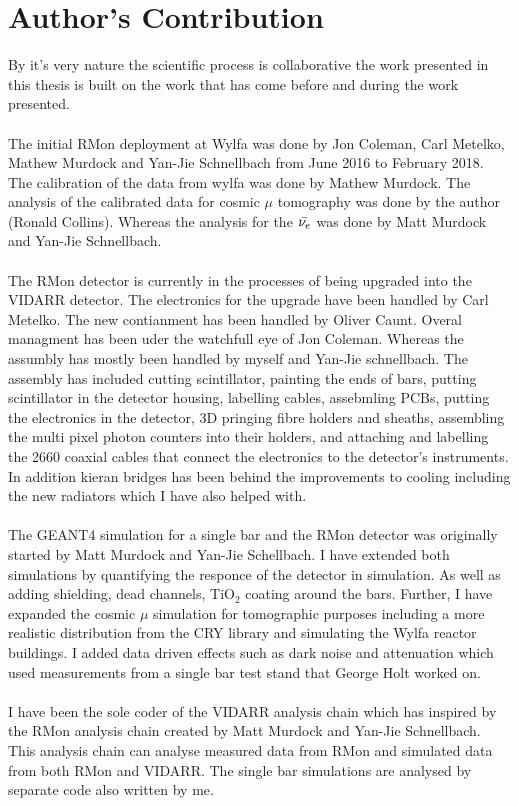 \chapter{Author's Contribution}

By it's very nature the scientific process is collaborative the work presented in this thesis is built on the work that has come before and during the work presented. 
\\\\The initial RMon deployment at Wylfa was done by Jon Coleman, Carl Metelko, Mathew Murdock and Yan-Jie Schnellbach from June 2016 to February 2018. The calibration of the data from wylfa was done by Mathew Murdock. The analysis of the calibrated data for cosmic $\mu$ tomography was done by the author (Ronald Collins). Whereas the analysis for the $\Bar{\nu_e}$ was done by Matt Murdock and Yan-Jie Schnellbach. 
\\\\The RMon detector is currently in the processes of being upgraded into the VIDARR detector. The electronics for the upgrade have been handled by Carl Metelko. The new contianment has been handled by Oliver Caunt. Overal managment has been uder the watchfull eye of Jon Coleman. Whereas the assumbly has mostly been handled by myself and Yan-Jie schnellbach. The assembly has included cutting scintillator, painting the ends of bars, putting scintillator in the detector housing, labelling cables, assebmling PCBs, putting the electronics in the detector, 3D pringing fibre holders and sheaths, assembling the multi pixel photon counters into their holders, and attaching and labelling the 2660 coaxial cables that connect the electronics to the detector's instruments. In addition kieran bridges has been behind the improvements to cooling including the new radiators which I have also helped with. 
\\\\The GEANT4 simulation for a single bar and the RMon detector was originally started by Matt Murdock and Yan-Jie Schellbach. I have extended both simulations by quantifying the responce of the detector in simulation. As well as adding shielding, dead channels, TiO$_2$ coating around the bars. Further, I have expanded the cosmic $\mu$  simulation for tomographic purposes including a more realistic distribution from the CRY library and simulating the Wylfa reactor buildings. I added data driven effects such as dark noise and attenuation which used measurements from a single bar test stand that George Holt worked on. 
\\\\I have been the sole coder of the VIDARR analysis chain which has inspired by the RMon analysis chain created by Matt Murdock and Yan-Jie Schnellbach. This analysis chain can analyse measured data from RMon and simulated data from both RMon and VIDARR. The single bar simulations are analysed by separate code also written by me. 

